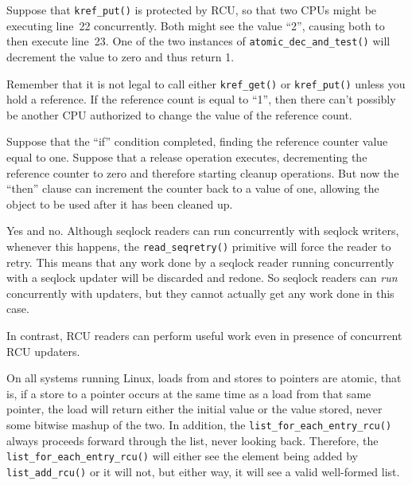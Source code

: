 
	  Suppose that {\tt kref\_put()} is protected by RCU, so
	  that two CPUs might be executing line~22 concurrently.
	  Both might see the value ``2'', causing both to then
	  execute line~23.
	  One of the two instances of {\tt atomic\_dec\_and\_test()}
	  will decrement the value to zero and thus return 1.


	  Remember that it is not legal to call either {\tt kref\_get()}
	  or {\tt kref\_put()} unless you hold a reference.
	  If the reference count is equal to ``1'', then there
	  can't possibly be another CPU authorized to change the
	  value of the reference count.


	  Suppose that the ``if'' condition completed, finding
	  the reference counter value equal to one.
	  Suppose that a release operation executes, decrementing
	  the reference counter to zero and therefore starting
	  cleanup operations.
	  But now the ``then'' clause can increment the counter
	  back to a value of one, allowing the object to be
	  used after it has been cleaned up.


Yes and no.
Although seqlock readers can run concurrently with
seqlock writers, whenever this happens, the {\tt read\_seqretry()}
primitive will force the reader to retry.
This means that any work done by a seqlock reader running concurrently
with a seqlock updater will be discarded and redone.
So seqlock readers can \emph{run} concurrently with updaters,
but they cannot actually get any work done in this case.

In contrast, RCU readers can perform useful work even in presence
of concurrent RCU updaters.


On all systems running Linux, loads from and stores
to pointers are atomic, that is, if a store to a pointer occurs at
the same time as a load from that same pointer, the load will return
either the initial value or the value stored, never some bitwise mashup
of the two.
In addition, the {\tt list\_for\_each\_entry\_rcu()} always proceeds
forward through the list, never looking back.
Therefore, the {\tt list\_for\_each\_entry\_rcu()} will either see
the element being added by {\tt list\_add\_rcu()} or it will not,
but either way, it will see a valid well-formed list.

